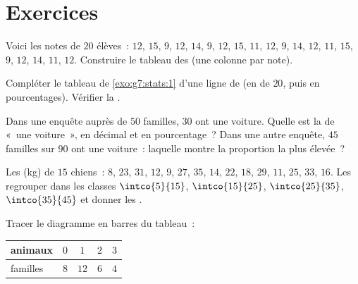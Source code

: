 \section{Exercices}

\begin{exercise}[$\star$]\label{exo:g7:stats:1}
Voici les notes de $20$ élèves~: $12$, $15$, $9$, $12$, $14$, $9$,
$12$, $15$, $11$, $12$, $9$, $14$, $12$, $11$, $15$, $9$, $12$, $14$,
$11$, $12$. Construire le tableau des  (une colonne par
note).
\end{exercise}

\begin{exercise}[$\star$]\label{exo:g7:stats:2}
Compléter le tableau de \cref{exo:g7:stats:1} d'une ligne de
 (en  de $20$, puis en pourcentages). Vérifier la
.
\end{exercise}

\begin{exercise}[$\star$]\label{exo:g7:stats:3}
Dans une enquête auprès de $50$ familles, $30$ ont une voiture.
Quelle est la  de «~une voiture~», en décimal et en
pourcentage~? Dans une autre enquête, $45$ familles sur $90$ ont une
voiture~: laquelle montre la proportion la plus élevée~?
\end{exercise}

\begin{exercise}[$\star$]\label{exo:g7:stats:4}
Les  (kg) de $15$ chiens~: $8$, $23$, $31$, $12$, $9$, $27$,
$35$, $14$, $22$, $18$, $29$, $11$, $25$, $33$, $16$. Les regrouper
dans les classes $\intco{5}{15}$, $\intco{15}{25}$, $\intco{25}{35}$,
$\intco{35}{45}$ et donner les .
\end{exercise}

\begin{exercise}[$\star$]\label{exo:g7:stats:5}
Tracer le diagramme en barres du tableau~:
\begin{center}
\renewcommand{\arraystretch}{1.2}
\begin{tabular}{l|cccc}
animaux & $0$ & $1$ & $2$ & $3$ \\
\hline
familles & $8$ & $12$ & $6$ & $4$ \\
\end{tabular}
\end{center}
\end{exercise}

